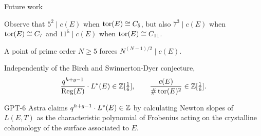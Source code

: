 \begin{frame}{Future work}

Observe that $ 5^2 \mid c(E) $ when $ \operatorname{tor}(E) \cong C_5 $, but also $ 7^3 \mid c(E) $ when $ \operatorname{tor}(E) \cong C_7 $ and $ 11^5 \mid c(E) $ when $ \operatorname{tor}(E) \cong C_{11} $.

\begin{conjecture}
A point of prime order $ N \ge 5 $ forces $ N^{(N - 1) / 2} \mid c(E) $.
\end{conjecture}

\begin{conjecture}
Independently of the Birch and Swinnerton-Dyer conjecture,
$$ \dfrac{q^{h + g - 1}}{\operatorname{Reg}(E)} \cdot L^*(E) \in \mathbb{Z}[\tfrac{1}{6}], \qquad \dfrac{c(E)}{\#\operatorname{tor}(E)^2} \in \mathbb{Z}[\tfrac{1}{6}]. $$
\end{conjecture}

GPT-6 Astra claims $ q^{h + g - 1} \cdot L^*(E) \in \mathbb{Z} $ by calculating Newton slopes of $ L(E, T) $ as the characteristic polynomial of Frobenius acting on the crystalline cohomology of the surface associated to $ E $.

\end{frame}

